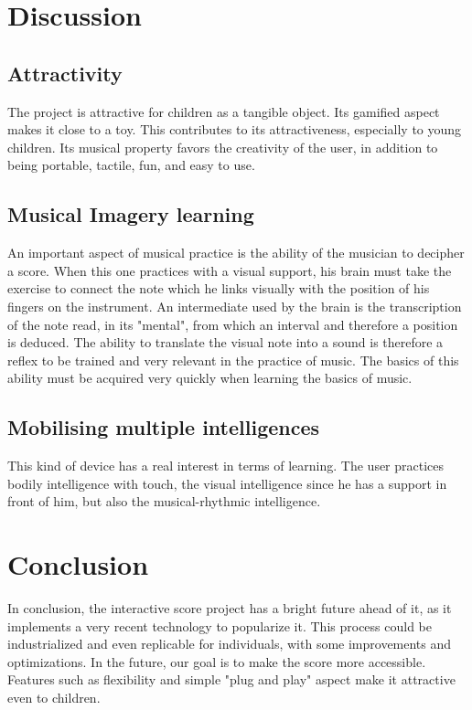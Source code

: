 \section{Discussion}

\subsection{Attractivity}

The project is attractive for children as a tangible object. 
Its gamified aspect makes it close to a toy. This contributes to its attractiveness, especially to young children. Its musical property favors the creativity of the user, in addition to being portable, tactile, fun, and easy to use. 

\subsection{Musical Imagery learning}

An important aspect of musical practice is the ability of the musician to decipher a score. When this one practices with a visual support, his brain must take the exercise to connect the note which he links visually with the position of his fingers on the instrument. An intermediate used by the brain is the transcription of the note read, in its "mental", from which an interval and therefore a position is deduced. The ability to translate the visual note into a sound is therefore a reflex to be trained and very relevant in the practice of music. The basics of this ability must be acquired very quickly when learning the basics of music.

\subsection{Mobilising multiple intelligences}

This kind of device has a real interest in terms of learning. The user practices bodily intelligence with touch, the visual intelligence since he has a support in front of him, but also the musical-rhythmic intelligence.

\section{Conclusion}

In conclusion, the interactive score project has a bright future ahead of it, as it implements a very recent technology to popularize it. This process could be industrialized and even replicable for individuals, with some improvements and optimizations. In the future, our goal is to make the score more accessible. Features such as flexibility and simple "plug and play" aspect make it attractive even to children.


